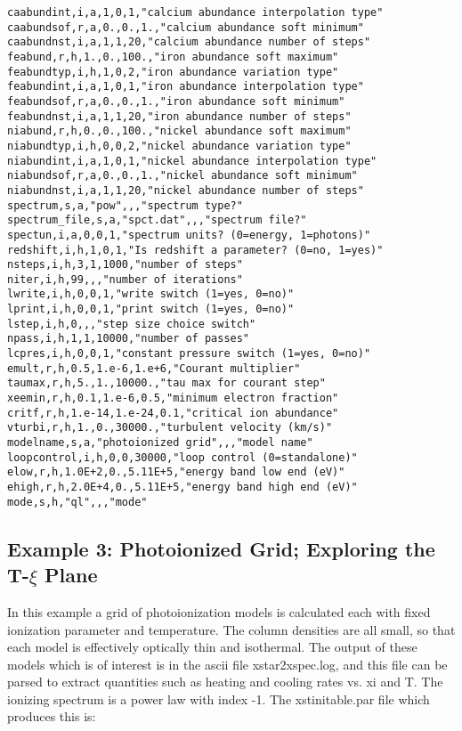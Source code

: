 \begin{verbatim}
caabundint,i,a,1,0,1,"calcium abundance interpolation type"
caabundsof,r,a,0.,0.,1.,"calcium abundance soft minimum"
caabundnst,i,a,1,1,20,"calcium abundance number of steps"
feabund,r,h,1.,0.,100.,"iron abundance soft maximum"
feabundtyp,i,h,1,0,2,"iron abundance variation type"
feabundint,i,a,1,0,1,"iron abundance interpolation type"
feabundsof,r,a,0.,0.,1.,"iron abundance soft minimum"
feabundnst,i,a,1,1,20,"iron abundance number of steps"
niabund,r,h,0.,0.,100.,"nickel abundance soft maximum"
niabundtyp,i,h,0,0,2,"nickel abundance variation type"
niabundint,i,a,1,0,1,"nickel abundance interpolation type"
niabundsof,r,a,0.,0.,1.,"nickel abundance soft minimum"
niabundnst,i,a,1,1,20,"nickel abundance number of steps"
spectrum,s,a,"pow",,,"spectrum type?"
spectrum_file,s,a,"spct.dat",,,"spectrum file?"
spectun,i,a,0,0,1,"spectrum units? (0=energy, 1=photons)"
redshift,i,h,1,0,1,"Is redshift a parameter? (0=no, 1=yes)"
nsteps,i,h,3,1,1000,"number of steps"
niter,i,h,99,,,"number of iterations"
lwrite,i,h,0,0,1,"write switch (1=yes, 0=no)"
lprint,i,h,0,0,1,"print switch (1=yes, 0=no)"
lstep,i,h,0,,,"step size choice switch"
npass,i,h,1,1,10000,"number of passes"
lcpres,i,h,0,0,1,"constant pressure switch (1=yes, 0=no)"
emult,r,h,0.5,1.e-6,1.e+6,"Courant multiplier"
taumax,r,h,5.,1.,10000.,"tau max for courant step"
xeemin,r,h,0.1,1.e-6,0.5,"minimum electron fraction"
critf,r,h,1.e-14,1.e-24,0.1,"critical ion abundance"
vturbi,r,h,1.,0.,30000.,"turbulent velocity (km/s)"
modelname,s,a,"photoionized grid",,,"model name"
loopcontrol,i,h,0,0,30000,"loop control (0=standalone)"
elow,r,h,1.0E+2,0.,5.11E+5,"energy band low end (eV)"
ehigh,r,h,2.0E+4,0.,5.11E+5,"energy band high end (eV)"
mode,s,h,"ql",,,"mode"

\end{verbatim}


\subsection{Example 3: Photoionized Grid; Exploring the T-$\xi$ Plane}

In this example a grid of photoionization models is calculated 
each with fixed ionization parameter and temperature.  The column 
densities are all small, so that each model is effectively optically thin 
and isothermal.  The output of these models which is of interest is in the 
ascii file xstar2xspec.log, and this file can be parsed to extract quantities
such as heating and cooling rates vs. xi and T.
The ionizing spectrum is a power law with index -1.
The xstinitable.par file which produces this is:


